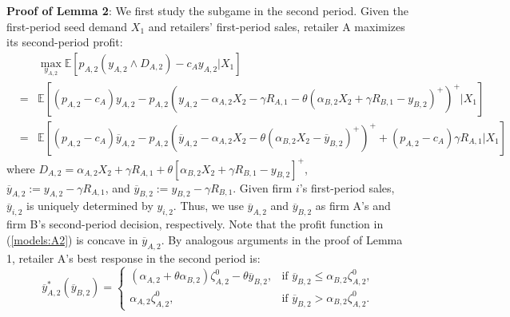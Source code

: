 \documentclass[nonblindrev,copyedit]{informs1}
\begin{document}
\begin{APPENDICES}
{\bf Proof of Lemma 2}: We first study the subgame in the second period. Given the first-period seed demand $X_1$ and retailers' first-period sales, retailer A maximizes its second-period profit:
\begin{eqnarray}
    & & \max_{y_{A,2}} \mathbb{E}\left[ p_{A,2}(y_{A,2} \wedge D_{A,2}) - c_A y_{A,2}|X_1  \right] \nonumber \\
    & = & \mathbb{E} \left[ (p_{A,2} -c_A)y_{A,2} - p_{A,2} \left(y_{A,2} - \alpha_{A,2} X_2 - \gamma R_{A,1} - \theta \left(\alpha_{B,2} X_2 + \gamma R_{B,1}- y_{B,2} \right)^+ \right )^+  \bigg| X_1  \right] \nonumber \\[4pt]
    & = & \mathbb{E} \left[ (p_{A,2} -c_A)\overline{y}_{A,2} - p_{A,2} \left(\overline{y}_{A,2} - \alpha_{A,2} X_2  - \theta \left(\alpha_{B,2} X_2 - \overline{y}_{B,2} \right)^+ \right )^+ + (p_{A,2} -c_A)\gamma R_{A,1} \bigg| X_1  \right]  \label{models:A2}
\end{eqnarray}
where $D_{A,2} = \alpha_{A,2} X_2 + \gamma R_{A,1} + \theta \left[\alpha_{B,2} X_2 + \gamma R_{B,1} - y_{B,2} \right]^+$, $\overline{y}_{A,2} := y_{A,2} - \gamma R_{A,1}$, and $\overline{y}_{B,2} := y_{B,2} - \gamma R_{B,1}$. Given firm $i$'s first-period sales, $\overline{y}_{i,2}$ is uniquely determined by $y_{i,2}$. Thus, we use $\overline{y}_{A,2}$ and $\overline{y}_{B,2}$ as firm A's and firm B's second-period decision, respectively. Note that the profit function in (\ref{models:A2}) is concave in $\overline{y}_{A,2}$. By analogous arguments in the proof of Lemma 1, retailer A's best response in the second period is:
\begin{equation} \label{models:BRA2}
    \overline{y}^*_{A,2}(\overline{y}_{B,2}) =  \begin{cases}
         (\alpha_{A,2} + \theta \alpha_{B,2}) \zeta^0_{A,2} - \theta \overline{y}_{B,2}, &  \text{if $\overline{y}_{B,2} \leq \alpha_{B,2} \zeta^0_{A,2}$,} \\
         \alpha_{A,2} \zeta^0_{A,2}, &  \text{if $\overline{y}_{B,2} > \alpha_{B,2}  \zeta^0_{A,2}$.}
    \end{cases}
\end{equation}


\end{APPENDICES}
\end{document}
